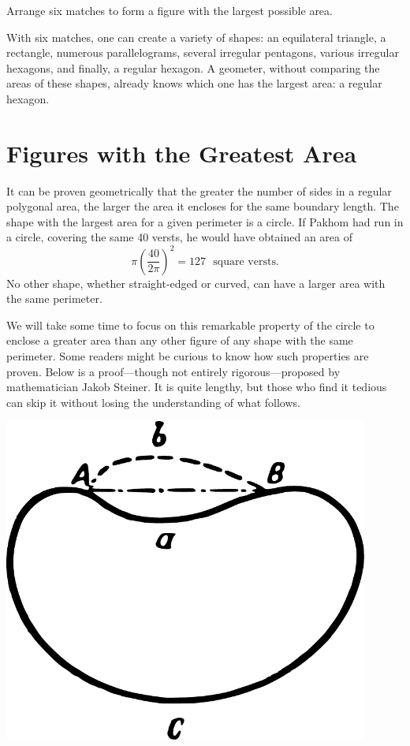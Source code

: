 \ques Arrange six matches to form a figure with the largest possible area.


\ans With six matches, one can create a variety of shapes: an equilateral triangle, a rectangle, numerous parallelograms, several irregular pentagons, various irregular hexagons, and finally, a regular hexagon. A geometer, without comparing the areas of these shapes, already knows which one has the largest area: a regular hexagon.


\section{Figures with the Greatest Area}
\label{sec-12.6}

It can be proven geometrically that the greater the number of sides in a regular polygonal area, the larger the area it encloses for the same boundary length. The shape with the largest area for a given perimeter is a circle. If Pakhom had run in a circle, covering the same 40 versts, he would have obtained an area of
\begin{equation*}%
 \pi \left( \frac{40}{2\pi} \right)^{2} = 127 \,\, \text{ square versts}. \end{equation*}
No other shape, whether straight-edged or curved, can have a larger area with the same perimeter.

We will take some time to focus on this remarkable property of the circle to enclose a greater area than any other figure of any shape with the same perimeter. Some readers might be curious to know how such properties are proven. Below is a proof—though not entirely rigorous—proposed by mathematician Jakob Steiner. It is quite lengthy, but those who find it tedious can skip it without losing the understanding of what follows.

\begin{marginfigure}[-3cm]%
\centering
\includegraphics[width=0.9\textwidth]{figures/ch-12/fig-177.pdf}
\end{marginfigure}

